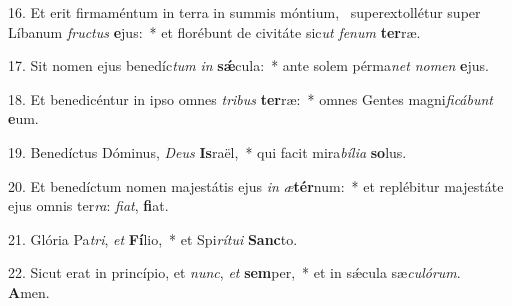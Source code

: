 16. Et erit firmaméntum in terra in summis móntium, \dag\  superextollétur super Líbanum \textit{fruc}\textit{tus} \textbf{e}jus:~*  et florébunt de civitáte sic\textit{ut} \textit{fe}\textit{num} \textbf{ter}ræ.\

17. Sit nomen ejus benedíc\textit{tum} \textit{in} \textbf{sǽ}cula:~*  ante solem pérma\textit{net} \textit{no}\textit{men} \textbf{e}jus.\

18. Et benedicéntur in ipso omnes \textit{tri}\textit{bus} \textbf{ter}ræ:~*  omnes Gentes magni\textit{fi}\textit{cá}\textit{bunt} \textbf{e}um.\

19. Benedíctus Dóminus, \textit{De}\textit{us} \textbf{Is}raël,~*  qui facit mira\textit{bí}\textit{li}\textit{a} \textbf{so}lus.\

20. Et benedíctum nomen majestátis ejus \textit{in} \textit{æ}\textbf{tér}num:~*  et replébitur majestáte ejus omnis ter\textit{ra}: \textit{fi}\textit{at}, \textbf{fi}at.\

21. Glória Pa\textit{tri}, \textit{et} \textbf{Fí}lio,~*  et Spi\textit{rí}\textit{tu}\textit{i} \textbf{Sanc}to.\

22. Sicut erat in princípio, et \textit{nunc}, \textit{et} \textbf{sem}per,~*  et in sǽcula sæ\textit{cu}\textit{ló}\textit{rum}. \textbf{A}men.\

